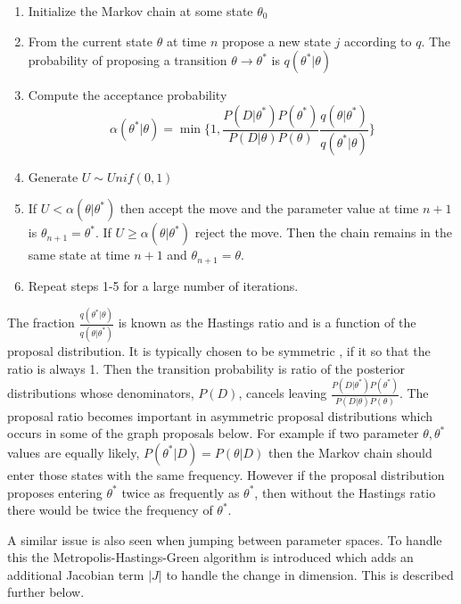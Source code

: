 \documentclass[11pt,a4paper]{article}
\numberwithin{equation}{section}
\begin{document}
\begin{enumerate}
\def\labelenumi{\arabic{enumi}.}
\item
  Initialize the Markov chain at some state \(\theta_0\)
\item
  From the current state \(\theta\) at time \(n\) propose a new state
  \(j\) according to \(q\). The probability of proposing a transition
  \(\theta \rightarrow \theta^*\) is \(q(\theta^*|\theta)\)
\item
  Compute the acceptance probability
  \[\alpha(\theta^*|\theta) = \min\{1, \frac{P(D|\theta^*)P(\theta^*)}{P(D|\theta)P(\theta)}\frac{q(\theta|\theta^*)}{q(\theta^*|\theta)} \}\]
\item
  Generate \(U \sim Unif(0,1)\)
\item
  If \(U < \alpha(\theta|\theta^*)\) then accept the move and the
  parameter value at time \(n+1\) is \(\theta_{n+1} = \theta^*\). If
  \(U \geq \alpha(\theta|\theta^*)\) reject the move. Then the chain
  remains in the same state at time \(n+1\) and
  \(\theta_{n+1} = \theta\).
\item
  Repeat steps 1-5 for a large number of iterations.
\end{enumerate}

The fraction \(\frac{q(\theta^*|\theta)}{q(\theta|\theta^*)}\) is known
as the Hastings ratio and is a function of the proposal distribution. It
is typically chosen to be symmetric  , if it so that the ratio is always 1. Then
the transition probability is ratio of the posterior distributions whose
denominators, \(P(D)\), cancels leaving
\(\frac{P(D|\theta^*)P(\theta^*)}{P(D|\theta)P(\theta)}\). The proposal
ratio becomes important in asymmetric proposal distributions which
occurs in some of the graph proposals below. For example if two
parameter \(\theta, \theta^*\) values are equally likely,
\(P(\theta^*|D) = P(\theta|D)\) then the Markov chain should enter those
states with the same frequency. However if the proposal distribution
proposes entering \(\theta^*\) twice as frequently as \(\theta^*\), then
without the Hastings ratio there would be twice the frequency of
\(\theta^*\).

A similar issue is also seen when jumping between parameter spaces. To
handle this the Metropolis-Hastings-Green algorithm is introduced which
adds an additional Jacobian term \(|J|\) to handle the change in
dimension. This is described further below.
\end{document}
